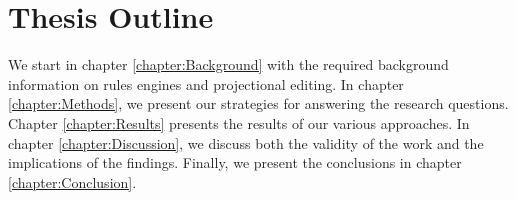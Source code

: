 \section{Thesis Outline}

We start in chapter \ref{chapter:Background} with the required background information on rules engines and projectional editing.
In chapter \ref{chapter:Methods}, we present our strategies for answering the research questions.
Chapter \ref{chapter:Results} presents the results of our various approaches.
In chapter \ref{chapter:Discussion}, we discuss both the validity of the work and the implications of the findings.
Finally, we present the conclusions in chapter \ref{chapter:Conclusion}.
